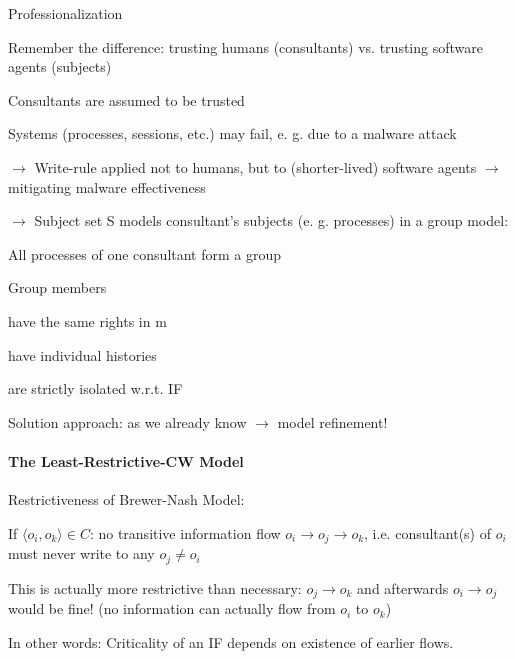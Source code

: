 \documentclass[a4paper]{article}
\begin{document}
\begin{multicols}{3}
    Professionalization
    \begin{itemize*}
        \item Remember the difference: trusting humans (consultants) vs. trusting software agents (subjects)
        \begin{itemize*}
            \item Consultants are assumed to be trusted
            \item Systems (processes, sessions, etc.) may fail, e. g. due to a malware attack
        \end{itemize*}
        \item $\rightarrow$ Write-rule applied not to humans, but to (shorter-lived) software agents $\rightarrow$ mitigating malware effectiveness
        \item $\rightarrow$ Subject set S models consultant’s subjects (e. g. processes) in a group model:
        \begin{itemize*}
            \item All processes of one consultant form a group
            \item Group members
            \begin{itemize*}
                \item have the same rights in m
                \item have individual histories
                \item are strictly isolated w.r.t. IF
            \end{itemize*}
        \end{itemize*}
        \item Solution approach: as we already know $\rightarrow$ model refinement!
    \end{itemize*}


    \paragraph{The Least-Restrictive-CW Model}
    Restrictiveness of Brewer-Nash Model:
    \begin{itemize*}
        \item If $⟨o_i,o_k⟩\in C$: no transitive information flow $o_i \rightarrow o_j\rightarrow o_k$, i.e. consultant(s) of $o_i$ must never write to any $o_j\not=o_i$
        \item This is actually more restrictive than necessary: $o_j\rightarrow o_k$ and afterwards $o_i\rightarrow o_j$ would be fine! (no information can actually flow from $o_i$ to $o_k$)
        \item In other words: Criticality of an IF depends on existence of earlier flows.
    \end{itemize*}


\end{multicols}
\end{document}
